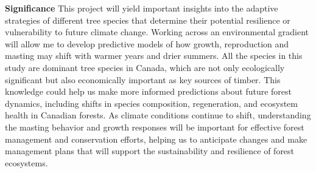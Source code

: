 \documentclass[12pt]{article}
\begin{document}
\textbf {Significance}
This project will yield important insights into the adaptive strategies of different tree species that determine their potential resilience or vulnerability to future climate change. Working across an environmental gradient will allow me to develop predictive models of how growth, reproduction and masting may shift with warmer years and drier summers. All the species in this study are dominant tree species in Canada, which are not only ecologically significant but also economically important as key sources of timber. This knowledge could help us make more informed predictions about future forest dynamics, including shifts in species composition, regeneration, and ecosystem health in Canadian forests. As climate conditions continue to shift, understanding the masting behavior and growth responses will be important for effective forest management and conservation efforts, helping us to anticipate changes and make management plans that will support the sustainability and resilience of forest ecosystems.


 
\end{document}
